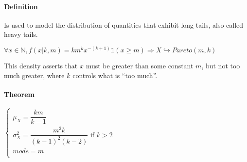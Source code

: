 \paragraph{Definition}
Is used to model the distribution of quantities that exhibit long tails, also called heavy tails.
\begin{center}
	$\forall x\in \mathbb{N}, f(x|k,m)= km^{k}x^{-(k+1)}\mathbb{1}(x\geq m)\Rightarrow X\hookrightarrow Pareto(m, k)$
\end{center}
This density asserts that $x$ must be greater than some constant $m$, but not too much greater,
where $k$ controls what is ``too much''.
\paragraph{Theorem}
\begin{center}
$\begin{cases}
	\mu_{X}=\dfrac{km}{k-1}\\
	\sigma_{X}^{2} = \dfrac{m^{2}k}{(k-1)^{2}(k-2)}\text{ if }k>2\\
	mode = m\\
\end{cases}$
\end{center}
